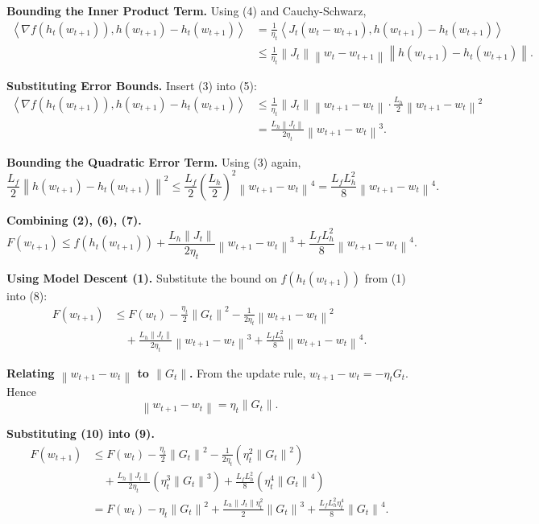 \documentclass{article}
\newcommand{\norm}[1]{\left\| #1 \right\|}
\newcommand{\inner}[2]{\left\langle #1, #2 \right\rangle}
\newcommand{\step}[1]{\text{[Step #1]}}
\begin{document}
\step{5} \textbf{Bounding the Inner Product Term.} Using (4) and Cauchy-Schwarz,
\begin{align}
    \inner{\nabla f(h_t(w_{t+1}))}{h(w_{t+1}) - h_t(w_{t+1})}
    &= \frac{1}{\eta_t} \inner{J_t (w_t - w_{t+1})}{h(w_{t+1}) - h_t(w_{t+1})} \\
    &\le \frac{1}{\eta_t} \norm{J_t} \norm{w_t - w_{t+1}} \norm{h(w_{t+1}) - h_t(w_{t+1})}. \tag{5}
\end{align}

\step{6} \textbf{Substituting Error Bounds.} Insert (3) into (5):
\begin{align}
    \inner{\nabla f(h_t(w_{t+1}))}{h(w_{t+1}) - h_t(w_{t+1})}
    &\le \frac{1}{\eta_t} \norm{J_t} \norm{w_{t+1} - w_t} \cdot \frac{L_h}{2} \norm{w_{t+1} - w_t}^2 \\
    &= \frac{L_h \norm{J_t}}{2\eta_t} \norm{w_{t+1} - w_t}^3. \tag{6}
\end{align}

\step{7} \textbf{Bounding the Quadratic Error Term.} Using (3) again,
\begin{equation}
    \frac{L_f}{2} \norm{h(w_{t+1}) - h_t(w_{t+1})}^2 \le \frac{L_f}{2} \left(\frac{L_h}{2}\right)^2 \norm{w_{t+1} - w_t}^4 = \frac{L_f L_h^2}{8} \norm{w_{t+1} - w_t}^4. \tag{7}
\end{equation}

\step{8} \textbf{Combining (2), (6), (7).}
\begin{equation}
    F(w_{t+1}) \le f(h_t(w_{t+1})) + \frac{L_h \norm{J_t}}{2\eta_t} \norm{w_{t+1} - w_t}^3 + \frac{L_f L_h^2}{8} \norm{w_{t+1} - w_t}^4. \tag{8}
\end{equation}

\step{9} \textbf{Using Model Descent (1).} Substitute the bound on $f(h_t(w_{t+1}))$ from (1) into (8):
\begin{align}
    F(w_{t+1}) &\le F(w_t) - \frac{\eta_t}{2} \norm{G_t}^2 - \frac{1}{2\eta_t}\norm{w_{t+1} - w_t}^2 \\
    &\quad + \frac{L_h \norm{J_t}}{2\eta_t} \norm{w_{t+1} - w_t}^3 + \frac{L_f L_h^2}{8} \norm{w_{t+1} - w_t}^4. \tag{9}
\end{align}

\step{10} \textbf{Relating $\norm{w_{t+1} - w_t}$ to $\norm{G_t}$.} From the update rule, $w_{t+1} - w_t = -\eta_t G_t$. Hence
\begin{equation}
    \norm{w_{t+1} - w_t} = \eta_t \norm{G_t}. \tag{10}
\end{equation}

\step{11} \textbf{Substituting (10) into (9).}
\begin{align}
    F(w_{t+1}) &\le F(w_t) - \frac{\eta_t}{2} \norm{G_t}^2 - \frac{1}{2\eta_t} (\eta_t^2 \norm{G_t}^2) \\
    &\quad + \frac{L_h \norm{J_t}}{2\eta_t} (\eta_t^3 \norm{G_t}^3) + \frac{L_f L_h^2}{8} (\eta_t^4 \norm{G_t}^4) \\
    &= F(w_t) - \eta_t \norm{G_t}^2 + \frac{L_h \norm{J_t} \eta_t^2}{2} \norm{G_t}^3 + \frac{L_f L_h^2 \eta_t^4}{8} \norm{G_t}^4. \tag{11}
\end{align}
\end{document}
